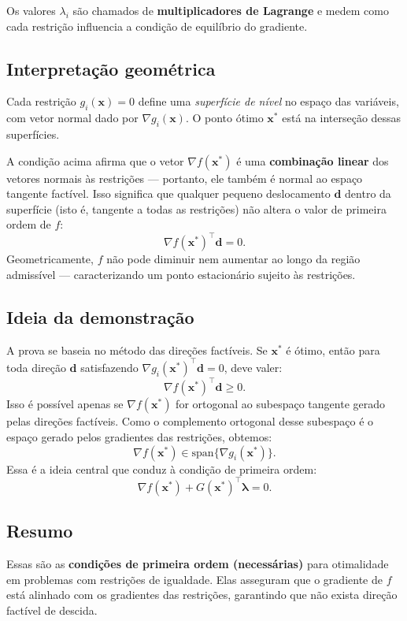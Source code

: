 \documentclass[9pt,a4paper]{extarticle}
\begin{document}
Os valores $\lambda_i$ são chamados de \textbf{multiplicadores de Lagrange} e medem como cada restrição influencia a condição de equilíbrio do gradiente.

\subsection*{Interpretação geométrica}

Cada restrição $g_i(\bm{x})=0$ define uma \textit{superfície de nível} no espaço das variáveis, com vetor normal dado por $\nabla g_i(\bm{x})$.  
O ponto ótimo $\bm{x}^*$ está na interseção dessas superfícies.

A condição acima afirma que o vetor $\nabla f(\bm{x}^*)$ é uma \textbf{combinação linear} dos vetores normais às restrições — portanto, ele também é normal ao espaço tangente factível.  
Isso significa que qualquer pequeno deslocamento $\bm{d}$ dentro da superfície (isto é, tangente a todas as restrições) não altera o valor de primeira ordem de $f$:
\[
\nabla f(\bm{x}^*)^\top \bm{d} = 0.
\]
Geometricamente, $f$ não pode diminuir nem aumentar ao longo da região admissível — caracterizando um ponto estacionário sujeito às restrições.

\subsection*{Ideia da demonstração}

A prova se baseia no método das direções factíveis.  
Se $\bm{x}^*$ é ótimo, então para toda direção $\bm{d}$ satisfazendo $\nabla g_i(\bm{x}^*)^\top \bm{d}=0$, deve valer:
\[
\nabla f(\bm{x}^*)^\top \bm{d} \ge 0.
\]
Isso é possível apenas se $\nabla f(\bm{x}^*)$ for ortogonal ao subespaço tangente gerado pelas direções factíveis.  
Como o complemento ortogonal desse subespaço é o espaço gerado pelos gradientes das restrições, obtemos:
\[
\nabla f(\bm{x}^*) \in \text{span}\{\nabla g_i(\bm{x}^*)\}.
\]
Essa é a ideia central que conduz à condição de primeira ordem:
\[
\nabla f(\bm{x}^*) + G(\bm{x}^*)^\top \bm{\lambda} = 0.
\]

\subsection*{Resumo}

Essas são as \textbf{condições de primeira ordem (necessárias)} para otimalidade em problemas com restrições de igualdade.  
Elas asseguram que o gradiente de $f$ está alinhado com os gradientes das restrições, garantindo que não exista direção factível de descida.
\end{document}

